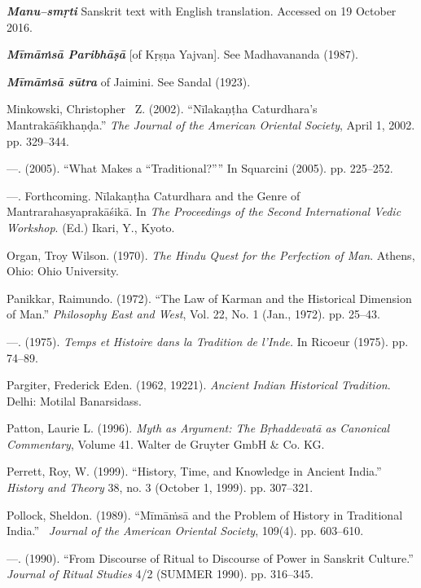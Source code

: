 \begin{thebibliography}{99}
  \textbf{\textit{Manu–smṛti}} Sanskrit text with English translation. Accessed on 19 October 2016.

  \textbf{\textit{Mīmāṁsā Paribhāṣā}} [of Kṛṣṇa Yajvan]. See Madhavananda (1987).

  \textbf{\textit{Mīmāṁsā sūtra}} of Jaimini. See Sandal (1923).

  Minkowski, Christopher  Z. (2002). “Nīlakaṇṭha Caturdhara's Mantrakāśīkhaṇḍa.” \textit{The Journal of the American Oriental Society}, April 1, 2002. pp. 329–344.

  —. (2005). “What Makes a “Traditional?”” In Squarcini (2005). pp. 225–252.

  —. Forthcoming. Nīlakaṇṭha Caturdhara and the Genre of Mantrarahasyaprakāśikā. In \textit{The Proceedings of the Second International Vedic Workshop}. (Ed.) Ikari, Y., Kyoto.

  Organ, Troy Wilson. (1970). \textit{The Hindu Quest for the Perfection of Man}. Athens, Ohio: Ohio University.

  Panikkar, Raimundo. (1972). “The Law of Karman and the Historical Dimension of Man.” \textit{Philosophy East and West}, Vol. 22, No. 1 (Jan., 1972). pp. 25–43.

  —. (1975). \textit{Temps et Histoire dans la Tradition de l’Inde.} In Ricoeur (1975). pp. 74–89.

  Pargiter, Frederick Eden. (1962, 19221). \textit{Ancient Indian Historical Tradition}. Delhi: Motilal Banarsidass.

  Patton, Laurie L. (1996). \textit{Myth as Argument: The Bṛhaddevatā as Canonical Commentary}, Volume 41. Walter de Gruyter GmbH \& Co. KG.

  Perrett, Roy, W. (1999). “History, Time, and Knowledge in Ancient India.” \textit{History and Theory} 38, no. 3 (October 1, 1999). pp. 307–321.

  Pollock, Sheldon. (1989). “Mīmāṁsā and the Problem of History in Traditional India.”  \textit{Journal of the American Oriental Society}, 109(4). pp. 603–610.

  —. (1990). “From Discourse of Ritual to Discourse of Power in Sanskrit Culture.” \textit{Journal of Ritual Studies} 4/2 (SUMMER 1990). pp. 316–345.


\end{thebibliography}
